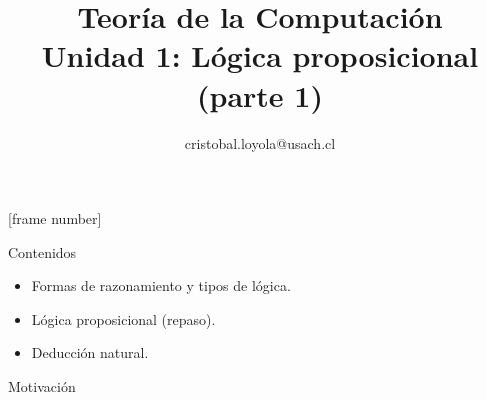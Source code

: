 \documentclass{beamer}
\begin{document}
\title[Lógica proposicional]{Teoría de la Computación \\ Unidad 1: Lógica
  proposicional (parte 1)} \author[Teoría de la
Computación]{cristobal.loyola@usach.cl} \date{}


\frame{\titlepage}

[frame number]

\begin{frame}{Contenidos}
  \begin{itemize}
    \item Formas de razonamiento y tipos de lógica.
    \item Lógica proposicional (repaso).
    \item Deducción natural.
  \end{itemize}
\end{frame}


\begin{frame}[plain,c]
  \vspace{1cm}
  \begin{center}
    \Huge Motivación
  \end{center}
\end{frame}
\end{document}

